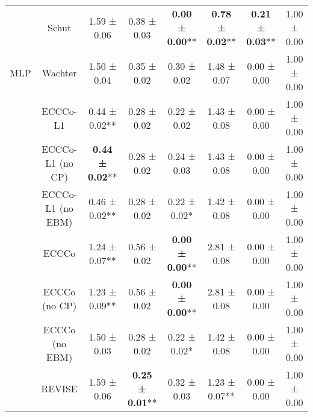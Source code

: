 \begin{table}
{\begin{tabular}[t]{cccccccc}
 & Schut & 1.59 ± 0.06\hphantom{*}\hphantom{*} & 0.38 ± 0.03\hphantom{*}\hphantom{*} & \textbf{0.00 ± 0.00}** & \textbf{0.78 ± 0.02}** & \textbf{0.21 ± 0.03}** & 1.00 ± 0.00\hphantom{*}\hphantom{*}\\

\multirow[t]{-9}{*}{\centering\arraybackslash MLP} & Wachter & 1.50 ± 0.04\hphantom{*}\hphantom{*} & 0.35 ± 0.02\hphantom{*}\hphantom{*} & 0.30 ± 0.02\hphantom{*}\hphantom{*} & 1.48 ± 0.07\hphantom{*}\hphantom{*} & 0.00 ± 0.00\hphantom{*}\hphantom{*} & 1.00 ± 0.00\hphantom{*}\hphantom{*}\\
\cmidrule{1-8}
 & ECCCo-L1 & 0.44 ± 0.02** & 0.28 ± 0.02\hphantom{*}\hphantom{*} & 0.22 ± 0.02\hphantom{*}\hphantom{*} & 1.43 ± 0.08\hphantom{*}\hphantom{*} & 0.00 ± 0.00\hphantom{*}\hphantom{*} & 1.00 ± 0.00\hphantom{*}\hphantom{*}\\

 & ECCCo-L1 (no CP) & \textbf{0.44 ± 0.02}** & 0.28 ± 0.02\hphantom{*}\hphantom{*} & 0.24 ± 0.03\hphantom{*}\hphantom{*} & 1.43 ± 0.08\hphantom{*}\hphantom{*} & 0.00 ± 0.00\hphantom{*}\hphantom{*} & 1.00 ± 0.00\hphantom{*}\hphantom{*}\\

 & ECCCo-L1 (no EBM) & 0.46 ± 0.02** & 0.28 ± 0.02\hphantom{*}\hphantom{*} & 0.22 ± 0.02*\hphantom{*} & 1.42 ± 0.08\hphantom{*}\hphantom{*} & 0.00 ± 0.00\hphantom{*}\hphantom{*} & 1.00 ± 0.00\hphantom{*}\hphantom{*}\\

 & ECCCo & 1.24 ± 0.07** & 0.56 ± 0.02\hphantom{*}\hphantom{*} & \textbf{0.00 ± 0.00}** & 2.81 ± 0.08\hphantom{*}\hphantom{*} & 0.00 ± 0.00\hphantom{*}\hphantom{*} & 1.00 ± 0.00\hphantom{*}\hphantom{*}\\

 & ECCCo (no CP) & 1.23 ± 0.09** & 0.56 ± 0.02\hphantom{*}\hphantom{*} & \textbf{0.00 ± 0.00}** & 2.81 ± 0.08\hphantom{*}\hphantom{*} & 0.00 ± 0.00\hphantom{*}\hphantom{*} & 1.00 ± 0.00\hphantom{*}\hphantom{*}\\

 & ECCCo (no EBM) & 1.50 ± 0.03\hphantom{*}\hphantom{*} & 0.28 ± 0.02\hphantom{*}\hphantom{*} & 0.22 ± 0.02*\hphantom{*} & 1.42 ± 0.08\hphantom{*}\hphantom{*} & 0.00 ± 0.00\hphantom{*}\hphantom{*} & 1.00 ± 0.00\hphantom{*}\hphantom{*}\\

 & REVISE & 1.59 ± 0.06\hphantom{*}\hphantom{*} & \textbf{0.25 ± 0.01}** & 0.32 ± 0.03\hphantom{*}\hphantom{*} & 1.23 ± 0.07** & 0.00 ± 0.00\hphantom{*}\hphantom{*} & 1.00 ± 0.00\hphantom{*}\hphantom{*}\\


\end{tabular}}
\end{table}
